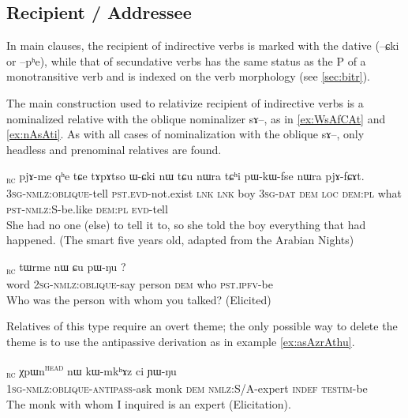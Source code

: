 \documentclass[oldfontcommands,oneside,a4paper,11pt]{article}
\newcommand{\ipa}[1]{{\phon #1}} %
\newcommand{\topic}{\textsc{dem}}
\newcommand{\tete}{\textsuperscript{\textsc{head}}}
\newcommand{\rc}{\textsubscript{\textsc{rc}}}
\begin{document}
\subsection{Recipient / Addressee}

In main clauses, the recipient of indirective verbs is marked with the dative (\ipa{--ɕki} or \ipa{--pʰe}), while that of secundative verbs has the same status as the P of a monotransitive verb and is indexed on the verb morphology (see \ref{sec:bitr}).

The main construction used to relativize recipient of indirective verbs is a nominalized  relative with the oblique nominalizer \ipa{sɤ}--, as in \ref{ex:WsAfCAt} and \ref{ex:nAsAti}. As with all cases of nominalization with the oblique \ipa{sɤ}--, only headless and prenominal relatives are found.


\begin{exe}
\ex \label{ex:WsAfCAt}
\gll
[\ipa{ɯ-sɤ-fɕɤt}]\rc{} 
\ipa{pjɤ-me} 	\ipa{qʰe} 	\ipa{tɕe} 	\ipa{tɤpɤtso} 	\ipa{ɯ-ɕki} 	\ipa{nɯ} 	\ipa{tɕu} 	\ipa{nɯra} 	\ipa{tɕʰi} 	\ipa{pɯ-kɯ-fse} 	\ipa{nɯra} 	\ipa{pjɤ-fɕɤt.} \\
\textsc{3sg-nmlz:oblique}-tell \textsc{pst.evd}-not.exist \textsc{lnk} \textsc{lnk} boy \textsc{3sg-dat} \textsc{dem} \textsc{loc} \textsc{dem:pl} what \textsc{pst-nmlz:S}-be.like  \textsc{dem:pl} \textsc{evd}-tell \\
\glt She had no one (else) to tell it to, so she told the boy everything that had happened. (The smart five years old, adapted from the Arabian Nights)
\end{exe} 


\begin{exe}
\ex \label{ex:nAsAti}
\gll [\ipa{tɯrju}  	\ipa{nɤ-sɤ-ti}]\rc{}  	\ipa{tɯrme}  	\ipa{nɯ}  	\ipa{ɕu}  	\ipa{pɯ-ŋu} ?\\
 word \textsc{2sg-nmlz:oblique}-say person \topic{}  who  \textsc{pst.ipfv}-be\\  
\glt  Who was the person with whom you talked? (Elicited)
\end{exe} 

Relatives of this type require an overt theme; the only possible way to delete the theme is to use the antipassive derivation   as in example \ref{ex:asAzrAthu}.

\begin{exe}
\ex \label{ex:asAzrAthu}
\gll [\ipa{a-sɤz-rɤ-tʰu}]\rc{}  	\ipa{χpɯn}\tete{}  	\ipa{nɯ}  	\ipa{kɯ-mkʰɤz}  	\ipa{ci}  	\ipa{ɲɯ-ŋu}    \\
\textsc{1sg-nmlz:oblique-antipass}-ask monk \topic{}  \textsc{nmlz:}S/A-expert \textsc{indef} \textsc{testim}-be \\
\glt The monk   with whom I inquired  is an expert (Elicitation). 
\end{exe} 
\end{document}
